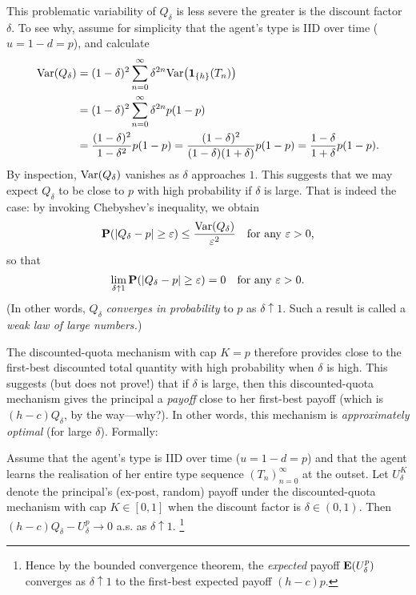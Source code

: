 This problematic variability of $Q_\delta$ is less severe the greater is the discount factor $\delta$.
To see why,
assume for simplicity that the agent's type is IID over time ($u=1-d=p$),
and calculate
%
\begin{align*}
	\Var( Q_\delta )
	&= (1-\delta)^2 \sum_{n=0}^\infty
	\delta^{2n} \Var\left( \1_{\{h\}}(T_n) \right)
	\\
	&= (1-\delta)^2 \sum_{n=0}^\infty
	\delta^{2n} p (1-p)
	\\
	&= \frac{ (1-\delta)^2 }{ 1 - \delta^2 } p (1-p)
	= \frac{ (1-\delta)^2 }{ (1-\delta) (1+\delta) } p (1-p)
	= \frac{ 1-\delta }{ 1+\delta } p (1-p) .
\end{align*}
%
By inspection, $\mathrm{Var}( Q_\delta )$ vanishes as $\delta$ approaches $1$.
This suggests that we may expect $Q_\delta$ to be close to $p$
with high probability if $\delta$ is large.
That is indeed the case: by invoking Chebyshev's inequality, we obtain
%
\begin{equation*}
	\PP\left( \abs*{ Q_\delta - p } \geq \eps \right)
	\leq \frac{ \Var( Q_\delta ) }{ \eps^2 } 
	\quad \text{for any $\eps>0$,}
\end{equation*}
%
so that
%
\begin{equation*}
	\lim_{\delta \uparrow 1 } \PP( \abs*{ Q_\delta - p } \geq \eps )
	= 0
	\quad \text{for any $\eps>0$.}
\end{equation*}
%
(In other words, $Q_\delta$ \emph{converges in probability} to $p$ as $\delta \uparrow 1$.
Such a result is called a \emph{weak law of large numbers.})

The discounted-quota mechanism with cap $K=p$
therefore provides close to the first-best discounted total quantity
with high probability when $\delta$ is high.
This suggests (but does not prove!) that if $\delta$ is large, then this discounted-quota mechanism gives the principal a \emph{payoff} close to her first-best payoff (which is $(h-c) Q_\delta$, by the way---why?).
In other words, this mechanism is \emph{approximately optimal} (for large $\delta$). Formally:

\begin{proposition}
	\label{proposition:JacksonSonnenschein}
	Assume that the agent's type is IID over time ($u=1-d=p$)
	and that the agent learns the realisation of her entire type sequence $(T_n)_{n=0}^\infty$ at the outset.
	Let $U_\delta^K$ denote the principal's (ex-post, random) payoff under the discounted-quota mechanism with cap $K \in [0,1]$
	when the discount factor is $\delta \in (0,1)$.
	Then $(h-c) Q_\delta - U_\delta^p \to 0$ a.s. as $\delta \uparrow 1$.%
		\footnote{Hence by the bounded convergence theorem,
		the \emph{expected} payoff $\mathbf{E}( U_\delta^p )$ converges as $\delta \uparrow 1$
		to the first-best expected payoff $(h-c)p$.}
\end{proposition}

